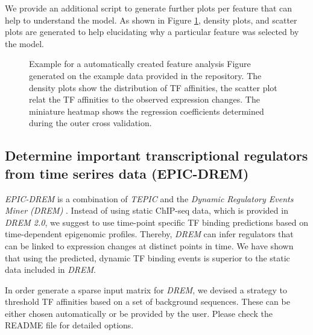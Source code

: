 \documentclass{article}
\begin{document}
We provide an additional script to generate further plots per feature that can help to understand the model. As shown in Figure \ref{ExampleAnalysisOfDynamite},
density plots, and scatter plots are generated to help elucidating why a particular feature was selected by the model.
\begin{figure}[h!]
\centering

\caption{Example for a automatically created feature analysis Figure generated on the example data provided in the repository. The density plots show the distribution of TF affinities, the
scatter plot relat the TF affinities to the observed expression changes. The miniature heatmap shows the regression coefficients determined during the outer cross validation.}
\label{ExampleAnalysisOfDynamite}
\end{figure}

\newpage
\mbox{}
\newpage

\subsection*{Determine important transcriptional regulators from time serires data (EPIC-DREM)}
\textit{EPIC-DREM} is a combination of \textit{TEPIC}  and the \textit{Dynamic Regulatory Events Miner (DREM)} \cite{pmid17224918}.
Instead of using static ChIP-seq data, which is provided in \textit{DREM 2.0}, we suggest to use time-point specific TF binding predictions
based on time-dependent epigenomic profiles. Thereby, \textit{DREM} can infer regulators that can be linked to expression changes at distinct points in time.
We have shown that using the predicted, dynamic TF binding events is superior to the static data included in \textit{DREM}.

In order generate a sparse input matrix for \textit{DREM}, we devised a strategy to threshold TF affinities based on a set of background sequences.
These can be either chosen automatically or be provided by the user. Please check the README file for detailed options. 
\end{document}
